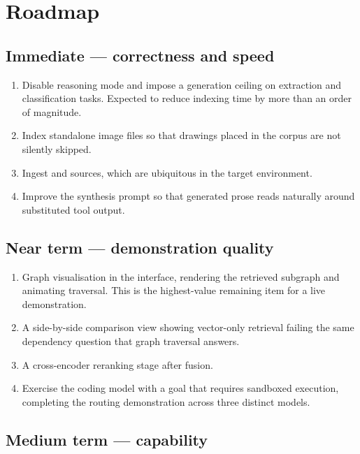 \section{Roadmap}

\subsection{Immediate --- correctness and speed}

\begin{enumerate}
\item Disable reasoning mode and impose a generation ceiling on extraction and
      classification tasks. Expected to reduce indexing time by more than an
      order of magnitude.
\item Index standalone image files so that drawings placed in the corpus are
      not silently skipped.
\item Ingest  and  sources, which are ubiquitous in the
      target environment.
\item Improve the synthesis prompt so that generated prose reads naturally
      around substituted tool output.
\end{enumerate}

\subsection{Near term --- demonstration quality}

\begin{enumerate}
\item Graph visualisation in the interface, rendering the retrieved subgraph
      and animating traversal. This is the highest-value remaining item for a
      live demonstration.
\item A side-by-side comparison view showing vector-only retrieval failing the
      same dependency question that graph traversal answers.
\item A cross-encoder reranking stage after fusion.
\item Exercise the coding model with a goal that requires sandboxed execution,
      completing the routing demonstration across three distinct models.
\end{enumerate}

\subsection{Medium term --- capability}

